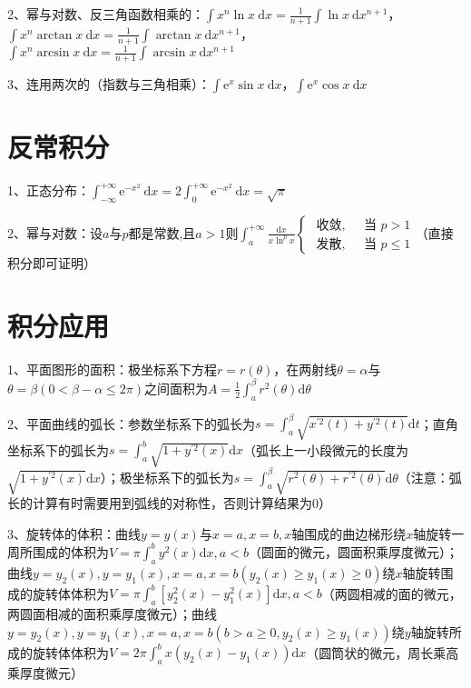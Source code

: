 2、幂与对数、反三角函数相乘的：$\int x^{n} \ln x \mathrm{~d} x=\frac{1}{n+1} \int \ln x \mathrm{~d} x^{n+1}$，$\int x^{n} \arctan x \mathrm{~d} x=\frac{1}{n+1} \int \arctan x \mathrm{~d} x^{n+1}$，$\int x^{n} \arcsin x \mathrm{~d} x=\frac{1}{n+1} \int \arcsin x \mathrm{~d} x^{n+1}$

3、连用两次的（指数与三角相乘）：$\int \mathrm{e}^{x} \sin x \mathrm{~d} x$，$\int \mathrm{e}^{x} \cos x \mathrm{~d} x$

\section{反常积分}

1、正态分布：$\int_{-\infty}^{+\infty} \mathrm{e}^{-x^{2}} \mathrm{~d} x=2 \int_{0}^{+\infty} \mathrm{e}^{-x^{2}} \mathrm{~d} x=\sqrt{\pi}$

2、幂与对数：设$a$与$p$都是常数,且$a>1$则$\int_{a}^{+\infty} \frac{\mathrm{d} x}{x \ln ^{p} x} \begin{cases}\text { 收敛, } & \text { 当 } p>1 \\ \text { 发散, } & \text { 当 } p \leqslant 1\end{cases}$（直接积分即可证明）

\section{积分应用}

1、平面图形的面积：极坐标系下方程$r=r(\theta)$，在两射线$\theta=\alpha$与$\theta=\beta(0<\beta-\alpha \leqslant 2 \pi)$之间面积为$A=\frac{1}{2} \int_{a}^{\beta} r^{2}(\theta) \mathrm{d} \theta$

2、平面曲线的弧长：参数坐标系下的弧长为$s=\int_{a}^{\beta} \sqrt{x^{\prime 2}(t)+y^{\prime 2}(t)} \mathrm{d} t$；直角坐标系下的弧长为$s=\int_{a}^{b} \sqrt{1+y^{\prime 2}(x)} \mathrm{d} x$（弧长上一小段微元的长度为$\sqrt{1+y^{\prime 2}(x)} \mathrm{d} x$）；极坐标系下的弧长为$s=\int_{a}^{\beta} \sqrt{r^{2}(\theta)+r^{\prime 2}(\theta)} \mathrm{d} \theta$（注意：弧长的计算有时需要用到弧线的对称性，否则计算结果为0）

3、旋转体的体积：曲线$y=y(x)$与$x=a, x=b, x$轴围成的曲边梯形绕$x$轴旋转一周所围成的体积为$V=\pi \int_{a}^{b} y^{2}(x) \mathrm{d} x, a<b$（圆面的微元，圆面积乘厚度微元）；曲线$y=y_{2}(x), y=y_{1}(x), x=a, x=b\left(y_{2}(x) \geqslant y_{1}(x) \geqslant 0\right)$绕$x$轴旋转围成的旋转体体积为$V=\pi \int_{a}^{b}\left[y_{2}^{2}(x)-y_{1}^{2}(x)\right] \mathrm{d} x, a<b$（两圆相减的面的微元，两圆面相减的面积乘厚度微元）；曲线$y=y_{2}(x), y=y_{1}(x), x=a, x=b\left(b>a \geqslant 0, y_{2}(x) \geqslant y_{1}(x)\right)$绕$y$轴旋转所成的旋转体体积为$V=2 \pi \int_{a}^{b} x\left(y_{2}(x)-y_{1}(x)\right) \mathrm{d} x$（圆筒状的微元，周长乘高乘厚度微元）

